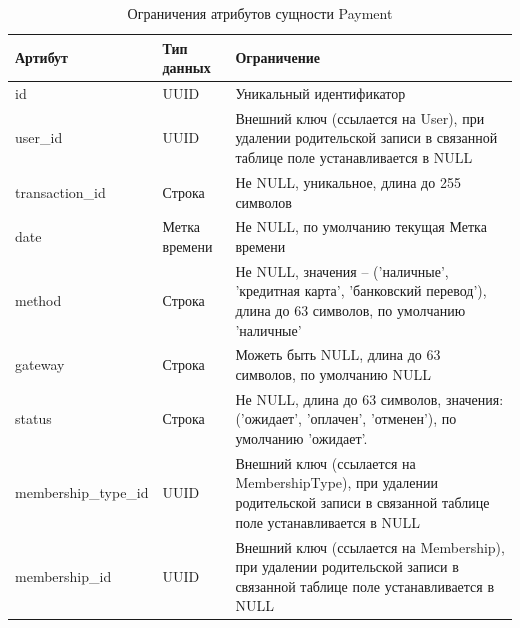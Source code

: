 \begin{table}[H]
	\centering
	\begin{tabular}{|p{4.5cm}|p{3.5cm}|p{7.5cm}|}
		\hline
		\textbf{Артибут}             & \textbf{Тип данных}   & \textbf{Ограничение}             \\ \hline
		id                            & UUID                 & Уникальный идентификатор         \\ \hline
		user\_id                     & UUID                & Внешний ключ (ссылается на User), при удалении родительской записи в связанной таблице поле устанавливается в NULL \\ \hline
		transaction\_id               & Строка                  & Не NULL, уникальное, длина до 255 символов                      \\ \hline
		date                          & Метка времени             & Не NULL, по умолчанию текущая Метка времени \\ \hline
		method                        & Строка                  & Не NULL, значения -- ('наличные', 'кредитная карта', 'банковский перевод'), длина до 63 символов, по умолчанию 'наличные' \\ \hline
		gateway                       & Строка               & Можеть быть NULL, длина до 63 символов, по умолчанию NULL                     \\ \hline
		status                        & Строка               & Не NULL, длина до 63 символов, значения: ('ожидает', 'оплачен', 'отменен'), по умолчанию 'ожидает'. \\ \hline
		membership\_type\_id          & UUID                 & Внешний ключ (ссылается на MembershipType), при удалении родительской записи в связанной таблице поле устанавливается в NULL \\ \hline
		membership\_id                      & UUID                 & Внешний ключ (ссылается на Membership), при удалении родительской записи в связанной таблице поле устанавливается в NULL \\ \hline
	\end{tabular}
	\caption{Ограничения атрибутов сущности Payment}
\end{table}

